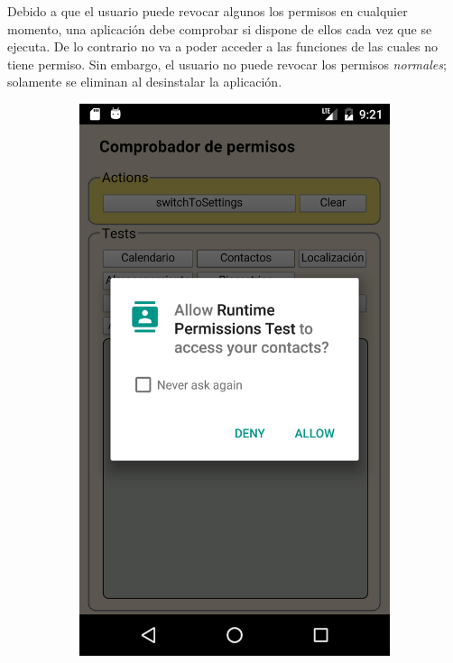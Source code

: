 Debido a que el usuario puede revocar algunos los permisos en cualquier momento, una aplicación debe comprobar si dispone de ellos cada vez que se ejecuta. De lo contrario no va a poder acceder a las funciones de las cuales no tiene permiso. Sin embargo, el usuario no puede revocar los permisos \emph{normales}; solamente se eliminan al desinstalar la aplicación.
\begin{figure}[btp]
    \centering
    \begin{subfigure}{0.35\linewidth}
        \includegraphics[width=\linewidth]{imgs/chapter5/allow_contact}

\end{subfigure}
\end{figure}
